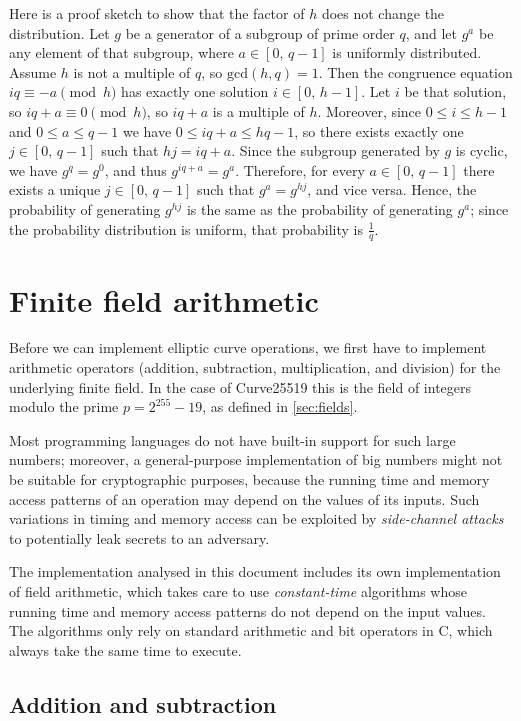 \documentclass[manuscript]{acmart}
\begin{document}
Here is a proof sketch to show that the factor of $h$ does not change the distribution.
Let $g$ be a generator of a subgroup of prime order $q$, and let $g^a$ be any element of that subgroup, where $a \in [0,\, q-1]$ is uniformly distributed.
Assume $h$ is not a multiple of $q$, so $\mathrm{gcd}(h, q) = 1$.
Then the congruence equation $iq \equiv -a \pmod{h}$ has exactly one solution $i \in [0,\, h-1]$.
Let $i$ be that solution, so $iq + a \equiv 0 \pmod{h}$, so $iq + a$ is a multiple of $h$.
Moreover, since $0 \le i \le h-1$ and $0 \le a \le q-1$ we have $0 \le iq + a \le hq - 1$, so there exists exactly one $j \in [0,\, q-1]$ such that $hj = iq + a$.
Since the subgroup generated by $g$ is cyclic, we have $g^{q} = g^0$, and thus $g^{iq+a} = g^a$.
Therefore, for every $a \in [0,\, q-1]$ there exists a unique $j \in [0,\, q-1]$ such that $g^a = g^{hj}$, and vice versa.
Hence, the probability of generating $g^{hj}$ is the same as the probability of generating $g^a$; since the probability distribution is uniform, that probability is $\frac{1}{q}$.

\section{Finite field arithmetic}\label{sec:field-arithmetic}

Before we can implement elliptic curve operations, we first have to implement arithmetic operators (addition, subtraction, multiplication, and division) for the underlying finite field.
In the case of Curve25519 this is the field of integers modulo the prime $p = 2^{255} - 19$, as defined in \autoref{sec:fields}.

Most programming languages do not have built-in support for such large numbers; moreover, a general-purpose implementation of big numbers might not be suitable for cryptographic purposes, because the running time and memory access patterns of an operation may depend on the values of its inputs.
Such variations in timing and memory access can be exploited by \emph{side-channel attacks} to potentially leak secrets to an adversary.

The implementation analysed in this document includes its own implementation of field arithmetic, which takes care to use \emph{constant-time} algorithms whose running time and memory access patterns do not depend on the input values.
The algorithms only rely on standard arithmetic and bit operators in C, which always take the same time to execute.

\subsection{Addition and subtraction}\label{sec:add-subtract}
\end{document}
